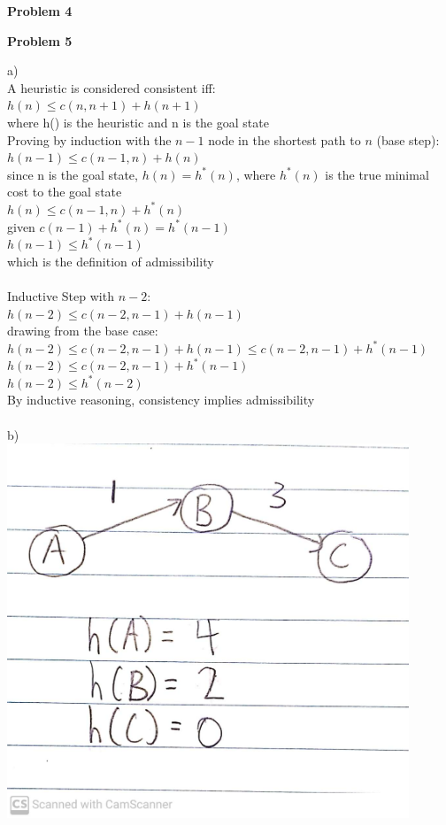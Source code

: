 \documentclass[11pt]{article}
\begin{document}
    \begin{center}
        \Large
        \textbf{Problem 4}
    \end{center}
    \normalsize

    \begin{center}
        \Large
        \textbf{Problem 5}
    \end{center}
    \normalsize
    a)\\
    A heuristic is considered consistent iff:\\
        $h(n) \leq c(n,n+1) + h(n+1)$\\
        where h() is the heuristic and n is the goal state\\
        Proving by induction with the $n-1$ node in the shortest path to $n$ (base step):\\
        $h(n-1) \leq c(n-1,n) + h(n)$\\
        since n is the goal state, $h(n)=h^*(n)$, where $h^*(n)$ is the true minimal cost to the goal state\\
        $h(n) \leq c(n-1,n) + h^*(n)$\\
        given $c(n-1) + h^*(n) = h^*(n-1)$\\
        $h(n-1) \leq h^*(n-1)$\\
        which is the definition of admissibility\\\\
        Inductive Step with $n-2$:\\
        $h(n-2) \leq c(n-2,n-1) + h(n-1)$\\
        drawing from the base case:\\
        $h(n-2) \leq c(n-2,n-1) + h(n-1) \leq c(n-2,n-1) + h^*(n-1)$\\
        $h(n-2)\leq c(n-2,n-1) + h^*(n-1)$\\
        $h(n-2) \leq h^*(n-2)$\\
        By inductive reasoning, consistency implies admissibility\\\\
    b)\\
    \includegraphics[width=0.9\textwidth]{images/prob_5_heuristic}
    
\end{document}
